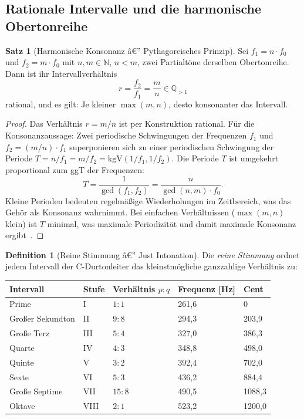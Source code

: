 ﻿\documentclass[a4paper,12pt]{article}
\theoremstyle{definition}
\newtheorem{definition}{Definition}
\newtheorem{satz}{Satz}
\begin{document}
\subsection{Rationale Intervalle und die harmonische Obertonreihe}

\begin{satz}[Harmonische Konsonanz â€” Pythagoreisches Prinzip]
\label{satz:pythagoras}
Sei $f_1 = n \cdot f_0$ und $f_2 = m \cdot f_0$ mit $n, m \in \mathbb{N}$, $n < m$,
zwei Partialtöne derselben Obertonreihe. Dann ist ihr Intervallverhältnis
\[
r = \frac{f_2}{f_1} = \frac{m}{n} \in \mathbb{Q}_{>1}
\]
rational, und es gilt: Je kleiner $\max(m, n)$, desto konsonanter das Intervall.
\end{satz}

\begin{proof}
Das Verhältnis $r = m/n$ ist per Konstruktion rational. Für die Konsonanzaussage:
Zwei periodische Schwingungen der Frequenzen $f_1$ und $f_2 = (m/n) \cdot f_1$
superponieren sich zu einer periodischen Schwingung der Periode
$T = n/f_1 = m/f_2 = \text{kgV}(1/f_1, 1/f_2)$.
Die Periode $T$ ist umgekehrt proportional zum ggT der Frequenzen:
\[
T = \frac{1}{\gcd(f_1, f_2)} = \frac{n}{\gcd(n,m) \cdot f_0}.
\]
Kleine Perioden bedeuten regelmäßige Wiederholungen im Zeitbereich, was das
Gehör als Konsonanz wahrnimmt. Bei einfachen Verhältnissen ($\max(m,n)$ klein) ist
$T$ minimal, was maximale Periodizität und damit maximale Konsonanz ergibt~\cite{helmholtz1863}.
\end{proof}

\begin{definition}[Reine Stimmung â€” Just Intonation]
Die \emph{reine Stimmung} ordnet jedem Intervall der C-Durtonleiter das
kleinstmögliche ganzzahlige Verhältnis zu:
\begin{center}
\begin{tabular}{lllll}
\toprule
Intervall & Stufe & Verhältnis $p:q$ & Frequenz [Hz] & Cent \\
\midrule
Prime     & I   & $1:1$   & 261,6 & 0 \\
Großer Sekundton & II  & $9:8$   & 294,3 & 203,9 \\
Große Terz & III & $5:4$   & 327,0 & 386,3 \\
Quarte    & IV  & $4:3$   & 348,8 & 498,0 \\
Quinte    & V   & $3:2$   & 392,4 & 702,0 \\
Sexte     & VI  & $5:3$   & 436,2 & 884,4 \\
Große Septime & VII & $15:8$ & 490,5 & 1088,3 \\
Oktave    & VIII & $2:1$  & 523,2 & 1200,0 \\
\bottomrule
\end{tabular}
\end{center}
\end{definition}
\end{document}
